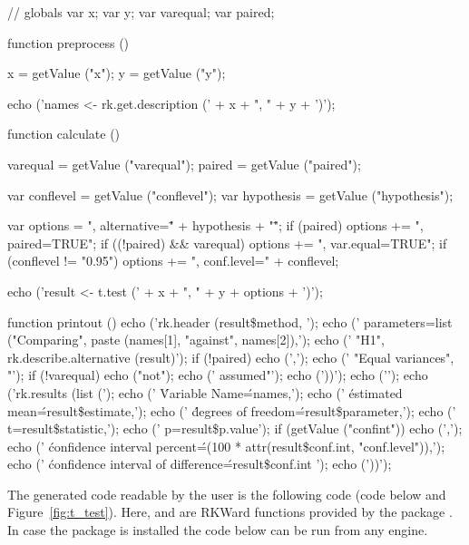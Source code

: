 \begin{footnotesize}
\begin{Code}
// globals
var x;
var y;
var varequal;
var paired;

function preprocess () {
  x = getValue ("x");
  y = getValue ("y");

  echo ('names <- rk.get.description (' + x + ", " + y + ')\n');
}

function calculate () {
  varequal = getValue ("varequal");
  paired = getValue ("paired");

  var conflevel = getValue ("conflevel");
  var hypothesis = getValue ("hypothesis");

  var options = ", alternative=\"" + hypothesis + "\"";
  if (paired) options += ", paired=TRUE";
  if ((!paired) && varequal) options += ", var.equal=TRUE";
  if (conflevel != "0.95") options += ", conf.level=" + conflevel;

  echo ('result <- t.test (' + x + ", " + y + options + ')\n');
}

function printout () {
  echo ('rk.header (result\$method, \n');
  echo ('  parameters=list ("Comparing", paste (names[1], "against", names[2]),\n');
  echo ('  "H1", rk.describe.alternative (result)');
  if (!paired) {
    echo (',\n');
    echo ('  "Equal variances", "');
    if (!varequal) echo ("not");
    echo (' assumed"');
  }
  echo ('))\n');
  echo ('\n');
  echo ('rk.results (list (\n');
  echo ('  \'Variable Name\'=names,\n');
  echo ('  \'estimated mean\'=result\$estimate,\n');
  echo ('  \'degrees of freedom\'=result\$parameter,\n');
  echo ('  t=result\$statistic,\n');
  echo ('  p=result\$p.value');
  if (getValue ("confint")) {
    echo (',\n');
    echo ('  \'confidence interval percent\'=(100 * attr(result\$conf.int, "conf.level")),\n');
    echo ('  \'confidence interval of difference\'=result\$conf.int ');
  }
  echo ('))\n');
}
\end{Code}
\end{footnotesize}

The generated code readable by the user is the following  code (code below and Figure~\ref{fig:t_test}). 
Here,  and  
are RKWard functions provided by the package . In case the package is installed the code below 
can be run from any  engine.

\begin{footnotesize}
\end{footnotesize}
